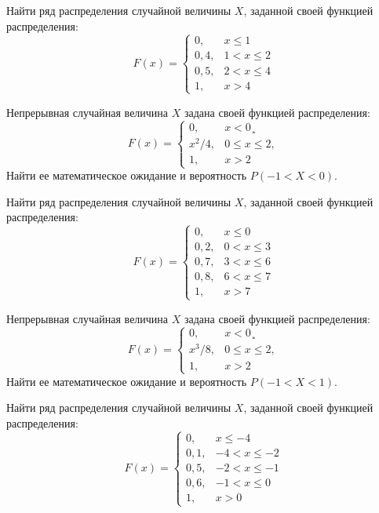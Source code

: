 \vfill

\newpage\setcounter{zad}{0}

\z Найти ряд распределения случайной величины $X$, заданной своей функцией распределения: $$ F(x) = \begin{cases}0, & x \leqslant 1 \\ 0{,}4, & 1 < x \leqslant 2 \\ 0{,}5, & 2 < x \leqslant 4 \\ 1, & x > 4 \end{cases} $$


\vfill

\z Непрерывная случайная величина $X$ задана своей функцией распределения: $$ F(x) = \begin{cases}0, & x < 0¸\\ x^2/4, & 0 \leqslant x \leqslant 2, \\ 1, & x > 2 \end{cases} $$ Найти ее математическое ожидание и вероятность $P(-1 < X < 0)$.
 

\vfill

\newpage\setcounter{zad}{0}

\z Найти ряд распределения случайной величины $X$, заданной своей функцией распределения: $$ F(x) = \begin{cases}0, & x \leqslant 0 \\ 0{,}2, & 0 < x \leqslant 3 \\ 0{,}7, & 3 < x \leqslant 6 \\ 0{,}8, & 6 < x \leqslant 7 \\ 1, & x > 7 \end{cases} $$


\vfill

\z Непрерывная случайная величина $X$ задана своей функцией распределения: $$ F(x) = \begin{cases}0, & x < 0¸\\ x^3/8, & 0 \leqslant x \leqslant 2, \\ 1, & x > 2 \end{cases} $$ Найти ее математическое ожидание и вероятность $P(-1 < X < 1)$.
 

\vfill

\newpage\setcounter{zad}{0}

\z Найти ряд распределения случайной величины $X$, заданной своей функцией распределения: $$ F(x) = \begin{cases}0, & x \leqslant -4 \\ 0{,}1, & -4 < x \leqslant -2 \\ 0{,}5, & -2 < x \leqslant -1 \\ 0{,}6, & -1 < x \leqslant 0 \\ 1, & x > 0 \end{cases} $$


